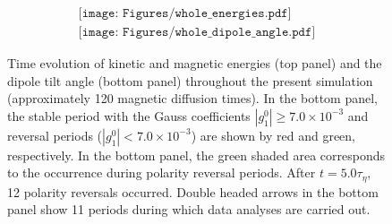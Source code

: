 \begin{figure}[ht]
\begin{center}
\[
\begin{array}{c}
\texttt{[image: Figures/whole\_energies.pdf]} \\
\texttt{[image: Figures/whole\_dipole\_angle.pdf]}
\end{array}
\]
\end{center}
\caption{
Time evolution of kinetic and magnetic energies (top panel) and the dipole tilt angle (bottom panel) throughout the present simulation (approximately 120 magnetic diffusion times). In the bottom panel, the stable period with the Gauss coefficients $|g_{1}^{0}| \ge 7.0 \times 10^{-3}$ and reversal periods ($|g_{1}^{0}| < 7.0 \times 10^{-3}$) are shown by red and green, respectively. 
In the bottom panel, the green shaded area corresponds to the occurrence during polarity reversal periods.
After $t = 5.0 \tau_{\eta}$, 12 polarity reversals occurred.
Double headed arrows in the bottom panel show 11 %
periods during which data analyses are carried out.
}
\label{fig:sph_shell_275_full}
\end{figure}